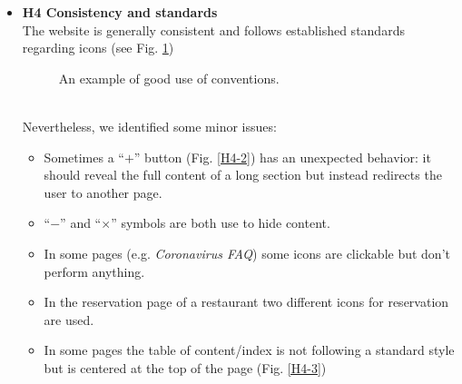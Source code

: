 \begin{itemize}
    \item \textbf{H4 Consistency and standards}\\
        The website is generally consistent and follows established standards regarding icons (see Fig. \ref{H4-1})
        \begin{figure}[!ht]
            \begin{minipage}{\linewidth}
                \centering
                \captionsetup{justification=centering}
                \caption{An example of good use of conventions.}
                \label{H4-1}
            \end{minipage}
        \end{figure}
        \pagebreak
        \\
        Nevertheless, we identified some minor issues:
        \begin{itemize}
            \item Sometimes a ``$+$'' button (Fig. \ref{H4-2}) has an unexpected behavior: it should reveal the full content of a long section but instead redirects the user to another page.
            \item ``$-$'' and ``$\times$'' symbols are both use to hide content.
            \item In some pages (e.g. \emph{Coronavirus FAQ}) some icons are clickable but don't perform anything.
            \item In the reservation page of a restaurant two different icons for reservation are used.
            \item In some pages the table of content/index is not following a standard style but is centered at the top of the page (Fig. \ref{H4-3})
        \end{itemize}
        \begin{figure}[!ht]
            \begin{minipage}{\linewidth}
                \centering

\end{minipage}
\end{figure}
\end{itemize}
